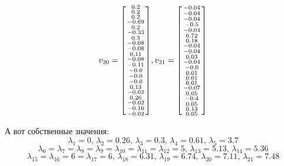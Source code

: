 \documentclass[a4paper,hidelinks,14pt]{extarticle}
\begin{document}
	$$
	v_{20}=\begin{bsmallmatrix}
		           0.2\\  
		0.2\\   
		0.2\\   
		-0.69\\      
		0.2\\   
		-0.33\\     
		0.3\\         
		-0.08\\
		-0.08\\    
		0.11\\       
		-0.08\\  
		-0.11\\    
		-0.0\\     
		-0.0\\      
		-0.0\\      
		0.13\\    
		-0.02\\   
		0.26\\       
		-0.02\\
		-0.16\\    
		-0.02\\ 
	\end{bsmallmatrix}, 
	v_{21}=\begin{bsmallmatrix}
		-0.04\\
		-0.04\\
		-0.04\\
		-0.5\\
		-0.04\\
		0.72\\
		0.18\\
		-0.04\\
		-0.04\\
		0.03\\
		-0.04\\
		-0.0\\
		0.01\\
		0.01\\
		0.01\\
		-0.07\\
		0.05\\
		-0.4\\
		0.05\\
		0.13\\
		0.05\\
	\end{bsmallmatrix}
	$$
	
	А вот собственные значения:
	$$
	\lambda_1=0,\,
	\lambda_2=0.26,\,
	\lambda_3=0.3,\,
	\lambda_4=0.61,\,
	\lambda_5=3.7
	$$
	$$
	\lambda_6=\lambda_7=\lambda_8=\lambda_9=\lambda_{10}=\lambda_{11}=\lambda_{12}=5,\,
	\lambda_{13}=5.13,\,
	\lambda_{14}=5.36
	$$
	$$
	\lambda_{15}=\lambda_{16}=6=\lambda_{17}=6,\,
	\lambda_{18}=6.31,\,
	\lambda_{19}=6.74,\,
	\lambda_{20}=7.11,\,
	\lambda_{21}=7.48
	$$
	
\end{document}
